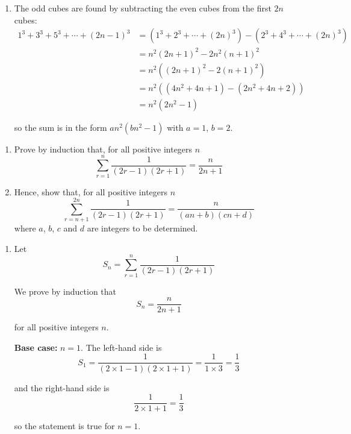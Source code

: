 \documentclass[leqno]{article}
\begin{document}
\begin{enumerate}[
  label=\textbf{\arabic*.},
  leftmargin=*,
  topsep=0pt,
  partopsep=0pt,
  parsep=0pt
]
\begin{djsSolution}
\begin{enumerate}[label=\textbf{(\alph*)}]
  \item The odd cubes are found by subtracting the even cubes from the first $2n$ cubes:
  \begin{align*}
  1^3+3^3+5^3+\cdots +(2n-1)^3
  &= \left(1^3+2^3+\cdots +(2n)^3\right) - \left(2^3+4^3+\cdots +(2n)^3\right) \\
  &= n^2(2n+1)^2 - 2n^2(n+1)^2 \\
  &= n^2\left((2n+1)^2-2(n+1)^2\right) \\
  &= n^2\left((4n^2+4n+1)-(2n^2+4n+2)\right) \\
  &= n^2(2n^2-1)
  \end{align*}

  so the sum is in the form $an^2(bn^2-1)$ with $a=1$, $b=2$.
\end{enumerate}
\end{djsSolution}


\newpage

\questionitem

\begin{enumerate}[label=\textbf{(\alph*)}]
  \item Prove by induction that, for all positive integers $n$
  \[
  \sum_{r=1}^{n} \frac{1}{(2r-1)(2r+1)}=\frac{n}{2n+1}
  \]
  \item Hence, show that, for all positive integers $n$
  \[
  \sum_{r=n+1}^{2n} \frac{1}{(2r-1)(2r+1)}=\frac{n}{(an+b)(cn+d)}
  \]
  where $a$, $b$, $c$ and $d$ are integers to be determined.  \\
\end{enumerate}

\vspace*{10pt}

\begin{djsSolution}
\begin{enumerate}[label=\textbf{(\alph*)}]
\item Let
\[
S_n=\sum_{r=1}^{n}\frac{1}{(2r-1)(2r+1)}
\]

We prove by induction that
\[
S_n=\frac{n}{2n+1}
\]

for all positive integers $n$.

\textbf{Base case:} $n=1$. The left-hand side is
\[
S_1=\frac{1}{(2\times1-1)(2\times1+1)}=\frac{1}{1\times3}=\frac13
\]

and the right-hand side is
\[
\frac{1}{2\times1+1}=\frac13
\]

so the statement is true for $n=1$.


\end{enumerate}
\end{djsSolution}
\end{enumerate}
\end{document}
